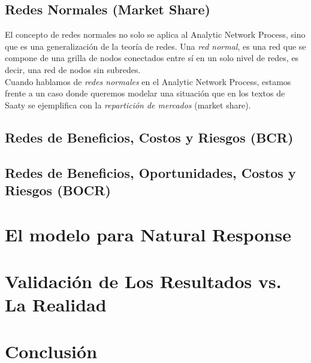 \documentclass[12pt,letterpaper]{article}
\begin{document}
\subsection{Redes Normales (Market Share)}
El concepto de redes normales no solo se aplica al Analytic Network Process, sino que es una generalización de la teoría de redes. Una \textit{red normal}, es una red que se compone de una grilla de nodos conectados entre sí en un solo nivel de redes, es decir, una red de nodos sin subredes.\\
Cuando hablamos de \textit{redes normales} en el Analytic Network Process, estamos frente a un caso donde queremos modelar una situación que en los textos de Saaty se ejemplifica con la \textit{repartición de mercados} (market share).
\subsection{Redes de  Beneficios, Costos y Riesgos (BCR)}
\subsection{Redes de  Beneficios, Oportunidades, Costos y Riesgos (BOCR)}


\section{El modelo para Natural Response}


\section{Validación de Los Resultados vs. La Realidad}

\section{Conclusión}
\end{document}
